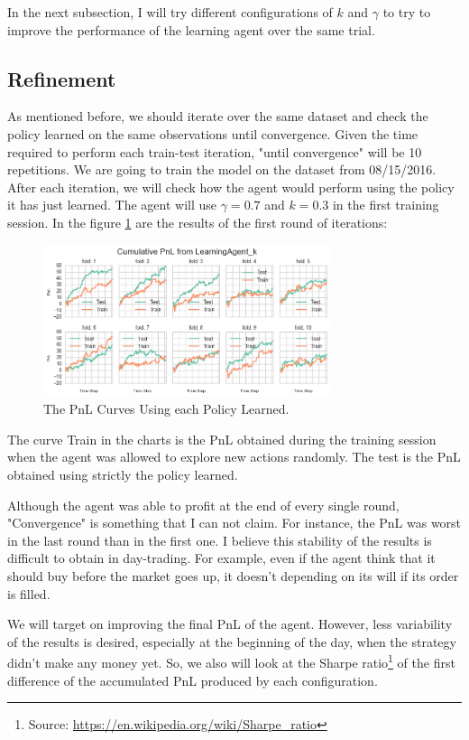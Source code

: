\documentclass[a4paper]{article}
\begin{document}
In the next subsection, I will try different configurations of $k$ and $\gamma$ to try to improve the performance of the learning agent over the same trial.

\subsection{Refinement}
As mentioned before, we should iterate over the same dataset and check the policy learned on the same observations until convergence. Given the time required to perform each train-test iteration, "until convergence" will be 10 repetitions. We are going to train the model on the dataset from 08/15/2016. After each iteration, we will check how the agent would perform using the policy it has just learned. The agent will use $\gamma=0.7$ and $k=0.3$ in the first training session. In the figure \ref{fig:policy_test_1} are the results of the first round of iterations:

\begin{figure}[ht]
\centering
\includegraphics[width=0.75\textwidth]{figures/policy_tests_1.png}
\caption{\label{fig:policy_test_1}The PnL Curves Using each Policy Learned.}
\end{figure}

The curve Train in the charts is the PnL obtained during the training session when the agent was allowed to explore new actions randomly. The test is the PnL obtained using strictly the policy learned.

Although the agent was able to profit at the end of every single round,  "Convergence" is something that I can not claim. For instance, the PnL was worst in the last round than in the first one. I believe this stability of the results is difficult to obtain in day-trading. For example, even if the agent think that it should buy before the market goes up, it doesn't depending on its will if its order is filled.

We will target on improving the final PnL of the agent. However, less variability of the results is desired, especially at the beginning of the day, when the strategy didn't make any money yet. So, we also will look at the Sharpe ratio\footnote{Source: \url{https://en.wikipedia.org/wiki/Sharpe_ratio}} of the first difference of the accumulated PnL produced by each configuration.
\end{document}
